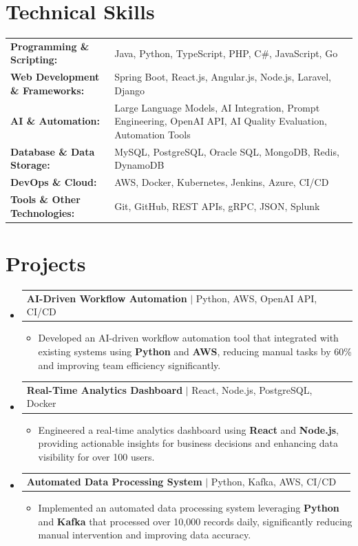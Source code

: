 \documentclass[letterpaper,10pt]{article}
\makeatletter
\newcommand{\resumeItem}[1]{
  \item{\fontsize{8pt}{9pt}\selectfont
    #1 \vspace{-3pt}
  }
}
\newcommand{\resumeProjectHeading}[2]{
    \item
    \begin{tabular*}{1.001\textwidth}{l@{\extracolsep{\fill}}r}
      \fontsize{8.5pt}{10pt}#1 & \textbf{\fontsize{8.5pt}{10pt} #2}\\
    \end{tabular*}\vspace{-7pt}
}
\newcommand{\resumeSubHeadingListStart}{\begin{itemize}[leftmargin=0pt, label={}]}
\newcommand{\resumeSubHeadingListEnd}{\end{itemize}}
\newcommand{\resumeItemListStart}{\begin{itemize}[leftmargin=*]}
\newcommand{\resumeItemListEnd}{\end{itemize}\vspace{-5pt}}
\makeatother
\begin{document}
\section{Technical Skills}
        \vspace{-14pt}
        \begin{table}[h]
            \fontsize{8pt}{9pt}\selectfont
            \begin{tabular}{p{0.3\linewidth} p{0.7\linewidth}}
                \textbf{Programming \& Scripting:} & Java, Python, TypeScript, PHP, C\#, JavaScript, Go \\
                \textbf{Web Development \& Frameworks:} & Spring Boot, React.js, Angular.js, Node.js, Laravel, Django \\
                \textbf{AI \& Automation:} & Large Language Models, AI Integration, Prompt Engineering, OpenAI API, AI Quality Evaluation, Automation Tools \\
                \textbf{Database \& Data Storage:} & MySQL, PostgreSQL, Oracle SQL, MongoDB, Redis, DynamoDB \\
                \textbf{DevOps \& Cloud:} & AWS, Docker, Kubernetes, Jenkins, Azure, CI/CD \\
                \textbf{Tools \& Other Technologies:} & Git, GitHub, REST APIs, gRPC, JSON, Splunk \\
            \end{tabular}
        \end{table}
 \vspace{-18pt}

\section{Projects}
    \vspace{-5pt}
    \resumeSubHeadingListStart
          \resumeProjectHeading
            {\textbf{AI-Driven Workflow Automation} $|$ Python, AWS, OpenAI API, CI/CD}{}
            \resumeItemListStart
                \resumeItem{Developed an AI-driven workflow automation tool that integrated with existing systems using \textbf{Python} and \textbf{AWS}, reducing manual tasks by 60\% and improving team efficiency significantly.}
            \resumeItemListEnd
        \vspace{-12pt}
    
        \resumeProjectHeading
            {\textbf{Real-Time Analytics Dashboard} $|$ React, Node.js, PostgreSQL, Docker}{}
        \resumeItemListStart
                \resumeItem{Engineered a real-time analytics dashboard using \textbf{React} and \textbf{Node.js}, providing actionable insights for business decisions and enhancing data visibility for over 100 users.}
        \resumeItemListEnd
      \vspace{-12pt}
      \resumeProjectHeading
        {\textbf{Automated Data Processing System} $|$ Python, Kafka, AWS, CI/CD}{}
    \resumeItemListStart
            \resumeItem{Implemented an automated data processing system leveraging \textbf{Python} and \textbf{Kafka} that processed over 10,000 records daily, significantly reducing manual intervention and improving data accuracy.}
    \resumeItemListEnd
    \resumeSubHeadingListEnd
\end{document}
